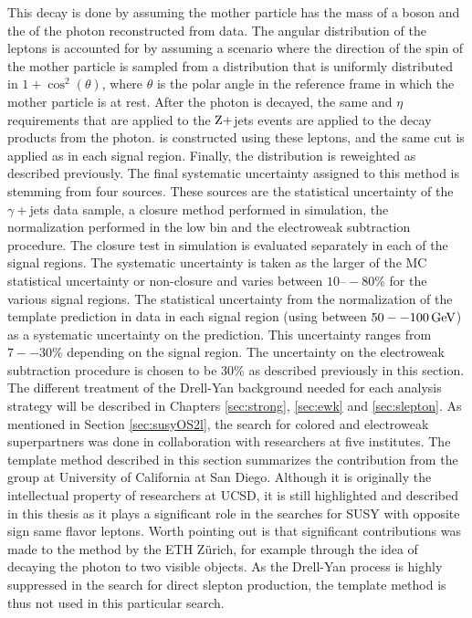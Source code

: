 This decay is done by assuming the mother particle has the mass of a \PZ boson and the \pt of the photon reconstructed from data. 
The angular distribution of the leptons is accounted for by assuming a scenario where the direction of the spin of the mother particle is sampled from a distribution that is uniformly distributed in $1+\cos^{2}(\theta)$, where $\theta$ is the polar angle in the reference frame in which the mother particle is at rest. 
After the photon is decayed, the same \pt and $\eta$ requirements that are applied to the $\mathrm{Z}+$jets events are applied to the decay products from the photon. 
\mttwol is constructed using these leptons, and the same cut is applied as in each signal region. 
Finally, the \pt distribution is reweighted as described previously.
\newpara
\noindent\justify
The final systematic uncertainty assigned to this method is stemming from four sources. 
These sources are the statistical uncertainty of the $\gamma+$jets data sample, a closure method performed in simulation, the normalization performed in the low \ptmiss bin and the electroweak subtraction procedure. 
The closure test in simulation is evaluated separately in each of the signal regions. 
The systematic uncertainty is taken as the larger of the MC statistical uncertainty or non-closure and varies between $10–-80\%$ for the various signal regions.
The statistical uncertainty from the normalization of the template prediction in data in each signal region (using \ptmiss between $50--100\,\text{Ge\hspace{-.08em}V}$) as a systematic uncertainty on the prediction. 
This uncertainty ranges from $7--30\%$ depending on the signal region.
The uncertainty on the electroweak subtraction procedure is chosen to be 30\% as described previously in this section. 
The different treatment of the Drell-Yan background needed for each analysis strategy will be described in Chapters \ref{sec:strong}, \ref{sec:ewk} and \ref{sec:slepton}.          
\newpara
\noindent\justify
As mentioned in Section \ref{sec:susyOS2l}, the search for colored and electroweak superpartners was done in collaboration with researchers at five institutes. 
The \ptmiss template method described in this section summarizes the contribution from the group at University of California at San Diego. 
Although it is originally the intellectual property of researchers at UCSD, it is still highlighted and described in this thesis as it plays a significant role in the searches for SUSY with opposite sign same flavor leptons. 
Worth pointing out is that significant contributions was made to the method by the ETH Z\"{u}rich, for example through the idea of decaying the photon to two visible objects. 
As the Drell-Yan process is highly suppressed in the search for direct slepton production, the \ptmiss template method is thus not used in this particular search.
